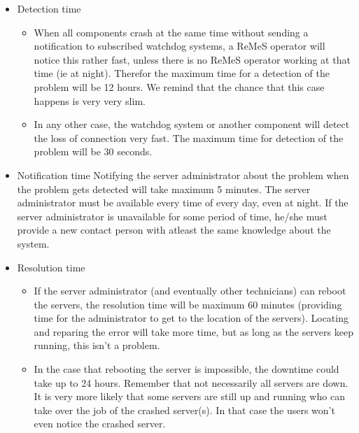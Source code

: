 \begin{itemize}
		\begin{itemize}
			\item Detection time
				\begin{itemize}
					\item When all components crash at the same time without sending a notification to subscribed watchdog systems, a ReMeS operator will notice this rather fast, unless
							there is no ReMeS operator working at that time (ie at night). Therefor the maximum time for a detection of the problem will be 12 hours. We remind that the chance
							that this case happens is very very slim.
					\item In any other case, the watchdog system or another component will detect the loss of connection very fast. The maximum time for detection of the problem will be 30 seconds.
				\end{itemize}
			\item Notification time
				Notifying the server administrator about the problem when the problem gets detected will take maximum 5 minutes. The server administrator must be available every time of every day, even
				at night. If the server administrator is unavailable for some period of time, he/she must provide a new contact person with atleast the same knowledge about the system.
			\item Resolution time
				\begin{itemize}
					\item If the server administrator (and eventually other technicians) can reboot the servers, the resolution time will be maximum 60 minutes (providing time for the administrator to
							get to the location of the servers). Locating and reparing the error will take more time, but as long as the servers keep running, this isn't a problem.
					\item In the case that rebooting the server is impossible, the downtime could take up to 24 hours. Remember that not necessarily all servers are down. It is very more
							likely that some servers are still up and running who can take over the job of the crashed server(s). In that case the users won't even notice the crashed server.
				\end{itemize}
		\end{itemize}
\end{itemize}
